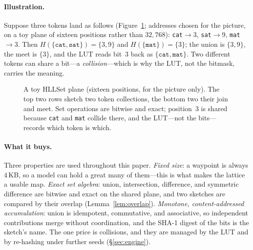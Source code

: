 \documentclass[11pt,a4paper]{article}
\theoremstyle{remark}
\newcommand{\HLL}{\ensuremath{H}}                      %
\begin{document}
\paragraph{Illustration.} Suppose three tokens land as follows (Figure~\ref{fig:hllset};
addresses chosen for the picture, on a toy plane of sixteen positions rather
than $32{,}768$):
\texttt{cat}$\to3$, \texttt{sat}$\to9$, \texttt{mat}$\to3$. Then
$\HLL(\{\texttt{cat},\texttt{sat}\})=\{3,9\}$ and
$\HLL(\{\texttt{mat}\})=\{3\}$; the union is $\{3,9\}$, the meet is $\{3\}$, and
the LUT reads bit~$3$ back as $\{\texttt{cat},\texttt{mat}\}$. Two different
tokens can share a bit---a \emph{collision}---which is why the LUT, not the
bitmask, carries the meaning.

\begin{figure}[t]
\centering
{}
\caption{A toy HLLSet plane (sixteen positions, for the picture only). The top
two rows sketch two token collections, the bottom two their join and meet. Set
operations are bitwise and exact; position~$3$ is shared because \texttt{cat}
and \texttt{mat} collide there, and the LUT---not the bits---records which token
is which.}
\label{fig:hllset}
\end{figure}

\paragraph{What it buys.} Three properties are used throughout this paper.
\emph{Fixed size}: a waypoint is always $4$\,KB, so a model can hold a great
many of them---this is what makes the lattice a usable map. \emph{Exact set
algebra}: union, intersection, difference, and symmetric difference are bitwise
and exact on the shared plane, and two sketches are compared by their overlap
(Lemma~\ref{lem:overlap}). \emph{Monotone, content-addressed accumulation}:
union is idempotent, commutative, and associative, so independent contributions
merge without coordination, and the SHA-1 digest of the bits is the sketch's
name. The one price is collisions, and they are managed by the LUT and by
re-hashing under further seeds (\S\ref{sec:engine}).
\end{document}
